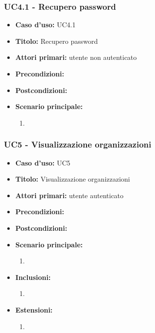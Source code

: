 \documentclass[casi-duso]{subfiles}
\begin{document}
\subsubsection{UC4.1 - Recupero password}
\label{subsub:uc4.1utente}
\begin{itemize}
  \item \textbf{Caso d’uso:} UC4.1 
  \item \textbf{Titolo:} Recupero password
  \item \textbf{Attori primari:} utente non autenticato
  \item \textbf{Precondizioni:} 
  \item \textbf{Postcondizioni:}
  \item \textbf{Scenario principale:} 
  \begin{enumerate}
    \item 
  \end{enumerate} 
\end{itemize}

\subsubsection{UC5 - Visualizzazione organizzazioni}
\label{subsub:uc5utente}
\begin{itemize}
  \item \textbf{Caso d’uso:} UC5 
  \item \textbf{Titolo:} Visualizzazione organizzazioni
  \item \textbf{Attori primari:} utente autenticato
  \item \textbf{Precondizioni:} 
  \item \textbf{Postcondizioni:}
  \item \textbf{Scenario principale:} 
  \begin{enumerate}
    \item 
  \end{enumerate}  
  \item \textbf{Inclusioni:} 
  \begin{enumerate}
    \item 
  \end{enumerate}
  \item \textbf{Estensioni:} 
  \begin{enumerate}
    \item 
  \end{enumerate}  
\end{itemize}
\end{document}
